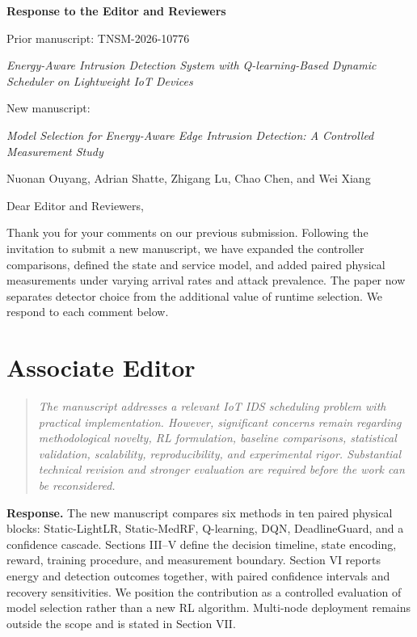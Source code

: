 \documentclass[11pt,a4paper]{article}
\newenvironment{comment}{\begin{quote}\small\itshape}{\end{quote}}
\newcommand{\response}{\noindent\textbf{Response.} }
\begin{document}
\begin{center}
{\Large\bfseries Response to the Editor and Reviewers}\par\medskip
Prior manuscript: TNSM-2026-10776\par
\textit{Energy-Aware Intrusion Detection System with Q-learning-Based Dynamic Scheduler on Lightweight IoT Devices}\par\medskip
New manuscript:\par
\textit{Model Selection for Energy-Aware Edge Intrusion Detection: A Controlled Measurement Study}\par\medskip
Nuonan Ouyang, Adrian Shatte, Zhigang Lu, Chao Chen, and Wei Xiang
\end{center}

Dear Editor and Reviewers,

Thank you for your comments on our previous submission. Following the invitation to submit a new manuscript, we have expanded the controller comparisons, defined the state and service model, and added paired physical measurements under varying arrival rates and attack prevalence. The paper now separates detector choice from the additional value of runtime selection. We respond to each comment below.

\section*{Associate Editor}
\begin{comment}
The manuscript addresses a relevant IoT IDS scheduling problem with practical implementation. However, significant concerns remain regarding methodological novelty, RL formulation, baseline comparisons, statistical validation, scalability, reproducibility, and experimental rigor. Substantial technical revision and stronger evaluation are required before the work can be reconsidered.
\end{comment}
\response The new manuscript compares six methods in ten paired physical blocks: Static-LightLR, Static-MedRF, Q-learning, DQN, DeadlineGuard, and a confidence cascade. Sections III--V define the decision timeline, state encoding, reward, training procedure, and measurement boundary. Section VI reports energy and detection outcomes together, with paired confidence intervals and recovery sensitivities. We position the contribution as a controlled evaluation of model selection rather than a new RL algorithm. Multi-node deployment remains outside the scope and is stated in Section VII.
\end{document}

